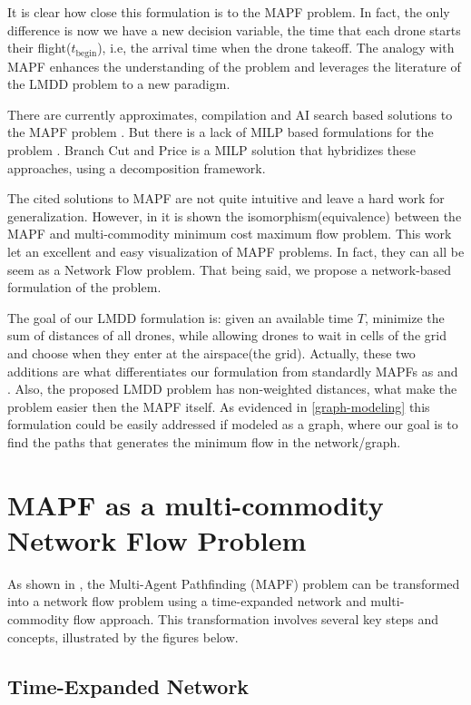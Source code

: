 It is clear how close this formulation is to the MAPF problem. In fact, the only difference is now we have a new decision variable, the time that each drone starts their flight($t_{\text{begin}}$), i.e, the arrival time when the drone takeoff. The analogy with MAPF enhances the understanding of the problem and leverages the literature of the LMDD problem to a new paradigm. 

There are currently approximates, compilation and AI search based solutions to the MAPF problem \cite{ma2019searching}. But there is a lack of MILP based formulations for the problem \cite{stern2019multi}. Branch Cut and Price \cite{BCPijcai2019} is a MILP solution that hybridizes these approaches, using a decomposition framework.

The cited solutions to MAPF are not quite intuitive and leave a hard work for generalization. However, in  it is shown the isomorphism(equivalence) between the MAPF and multi-commodity minimum cost maximum flow problem. This work let an excellent and easy visualization of MAPF problems. In fact, they can all be seem as a Network Flow problem. That being said, we propose a network-based formulation of the problem.

The goal of our LMDD formulation is: given an available time $T$, minimize the sum of distances of all drones, while allowing drones to wait in cells of the grid and choose when they enter at the airspace(the grid). Actually, these two additions are what differentiates our formulation from standardly MAPFs as  and . Also, the proposed LMDD problem has non-weighted distances, what make the problem easier then the MAPF itself. As evidenced in \ref{graph-modeling} this formulation could be easily addressed if modeled as a graph, where our goal is to find the paths that generates the minimum flow in the network/graph. 

\section{MAPF as a multi-commodity Network Flow Problem}

As shown in , the Multi-Agent Pathfinding (MAPF) problem can be transformed into a network flow problem using a time-expanded network and multi-commodity flow approach. This transformation involves several key steps and concepts, illustrated by the figures below.

\subsection{Time-Expanded Network}

